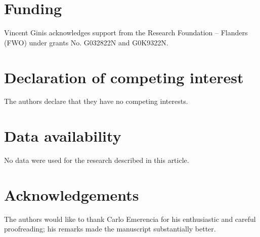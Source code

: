 \documentclass[11pt]{article}
\theoremstyle{definition}
\theoremstyle{remark}
\begin{document}
\section*{Funding}
Vincent Ginis acknowledges support from the Research Foundation -- Flanders (FWO) under grants No. G032822N and G0K9322N.

\section*{Declaration of competing interest}
The authors declare that they have no competing interests.

\section*{Data availability}
No data were used for the research described in this article.

\section*{Acknowledgements}
The authors would like to thank Carlo Emerencia for his enthusiastic and careful proofreading; his remarks made the manuscript substantially better.
\end{document}
